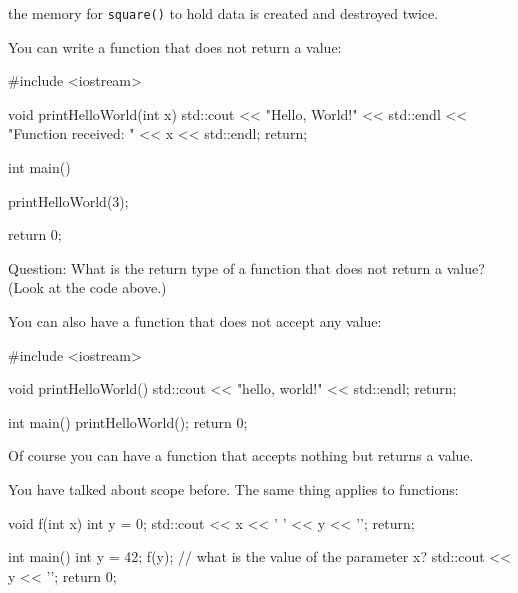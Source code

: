the memory for \texttt{square()} to hold data is created and destroyed twice.




\newpage{}

You can write a function that does not return a value:

\begin{consolethree}[escapeinside=||]
#include <iostream>

void printHelloWorld(int x)
{
    std::cout << "Hello, World!" << std::endl
              << "Function received: "
              << x
              << std::endl;
    return;
}

int main()
{
    printHelloWorld(3);

    return 0;
}
\end{consolethree}

Question: What is the return type of a function that does not return a value? (Look at the code above.)






\newpage{}

You can also have a function that does not accept any value:

\begin{consolethree}[escapeinside=||]
#include <iostream>

void printHelloWorld()
{
    std::cout << "hello, world!" << std::endl;
    return;
}

int main()
{
    printHelloWorld();
    return 0;
}
\end{consolethree}

Of course you can have a function that accepts nothing but returns a value.



\newpage{}

You have talked about scope before. The same thing applies to functions:

\begin{consolethree}[escapeinside=||]
void f(int x)
{
    int y = 0;
    std::cout << x << ' ' << y << '\n';
    return;
}

int main()
{
    int y = 42;
    f(y); // what is the value of the parameter x?
    std::cout << y << '\n';
    return 0;
}
\end{consolethree}

